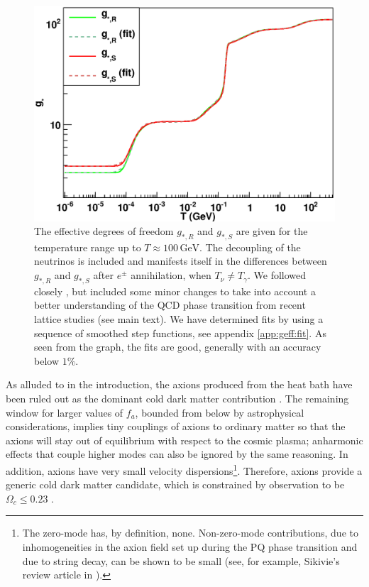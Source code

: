 \documentclass[preprint,nofootinbib]{revtex4}
\newcommand{\units}[1]{\, \mathrm{#1}}
\begin{document}
\begin{figure}[tbp]
\begin{center}
 \includegraphics[width=\figwidth,clip=true,trim=0mm 0mm 15mm 10mm]{geff.eps}
\end{center}
\caption{The effective degrees of freedom $g_{*,R}$ and $g_{*,S}$ are given for the temperature range up to $T\approx 100\units{GeV}$. The decoupling of the neutrinos is included and manifests itself in the differences between $g_{*,R}$ and $g_{*,S}$ after $e^\pm$ annihilation, when $T_\nu \neq T_\gamma$. We followed closely \cite{coleman:roos:geff}, but included some minor changes to take into account a better understanding of the QCD phase transition from recent lattice studies (see main text). We have determined fits by using a sequence of smoothed step functions, see appendix \ref{app:geff:fit}. As seen from the graph, the fits are good, generally with an accuracy below $1\%$.}\label{fig:geff}
\end{figure}

As alluded to in the introduction, the axions produced from the heat bath have been ruled out as the dominant cold dark matter contribution \cite{hannestad:mirizzi:raffelt:thermal:axion}. The remaining window for larger values of $f_a$, bounded from below by astrophysical considerations, implies tiny couplings of axions to ordinary matter so that the axions will stay out of equilibrium with respect to the cosmic plasma; anharmonic effects that couple higher modes can also be ignored by the same reasoning. In addition, axions have very small velocity dispersions\footnote{The zero-mode has, by definition, none. Non-zero-mode contributions, due to inhomogeneities in the axion field set up during the PQ phase transition and due to string decay, can be shown to be small (see, for example, Sikivie's review article in \cite{kuster:raffelt:beltran:axions}).}. Therefore, axions provide a generic cold dark matter candidate, which is constrained by observation to be $\Omega_c\le 0.23$ \cite{komatsu:wmap5:cosmological:interpretation}.
\end{document}
